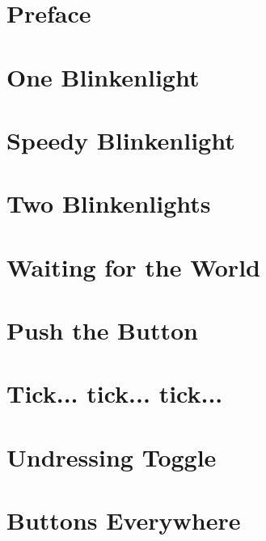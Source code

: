 \documentclass[a5paper,oneside]{scrbook}
\begin{document}
	



\tableofcontents

\chapter*{Preface\label{preface}}


\chapter{One Blinkenlight\label{ch1}}


\chapter{Speedy Blinkenlight\label{ch2}}


\chapter{Two Blinkenlights\label{ch3}}


\chapter*{Waiting for the World\label{medio1}}


\chapter{Push the Button\label{ch4}}


\chapter{Tick... tick... tick...\label{ch5a}}


\chapter{Undressing Toggle\label{ch5}}


\chapter{Buttons Everywhere\label{ch6}}

\end{document}

